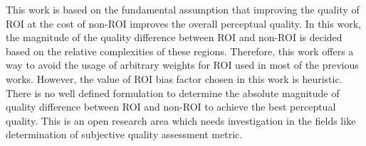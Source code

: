 This work is based on the fundamental assumption that improving the quality of ROI at the cost of non-ROI improves the overall perceptual quality. In this work, the magnitude of the quality difference between ROI and non-ROI is decided based on the relative complexities of these regions. Therefore, this work offers a way to avoid the usage of arbitrary weights for ROI used in most of the previous works. However, the value of ROI bias factor chosen in this work is heuristic. There is no well defined formulation to determine the absolute magnitude of quality difference between ROI and non-ROI to achieve the best perceptual quality. This is an open research area which needs investigation in the fields like determination of subjective quality assessment metric.